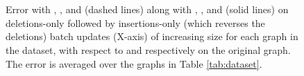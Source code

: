\begin{figure}[!hbt]
  \centering
   \\[-1ex]
   \\[-2ex]
\caption{Error with \StaWbar{}, \NaiWbar{}, and \FroWbar{} (dashed lines) along with \StaBarf{}, \NaiBarf{}, and \FroBarf{} (solid lines) on deletions-only followed by insertions-only (which reverses the deletions) batch updates (X-axis) of increasing size for each graph in the dataset, with respect to \StaWbar{} and \StaBarf{} respectively on the original graph. The error is averaged over the graphs in Table \ref{tab:dataset}.}
  \label{fig:stability}
\end{figure}
